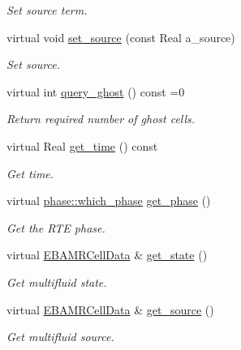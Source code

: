 \begin{DoxyCompactItemize}
\begin{DoxyCompactList}\small\item\em Set source term. \end{DoxyCompactList}\item 
virtual void \hyperlink{classrte__solver_aaf29812f6e521d9e0198eeb66485ec42}{set\+\_\+source} (const Real a\+\_\+source)
\begin{DoxyCompactList}\small\item\em Set source. \end{DoxyCompactList}\item 
virtual int \hyperlink{classrte__solver_a5f99f7de12f29d35cd5c34b4f7034a47}{query\+\_\+ghost} () const =0
\begin{DoxyCompactList}\small\item\em Return required number of ghost cells. \end{DoxyCompactList}\item 
virtual Real \hyperlink{classrte__solver_af9731409dd7c598299b17af24d10220f}{get\+\_\+time} () const 
\begin{DoxyCompactList}\small\item\em Get time. \end{DoxyCompactList}\item 
virtual \hyperlink{namespacephase_a23c76f548a5eb1955ed8c929c541108b}{phase\+::which\+\_\+phase} \hyperlink{classrte__solver_a061ff24e668e77255566fe2fbb7cd424}{get\+\_\+phase} ()
\begin{DoxyCompactList}\small\item\em Get the R\+TE phase. \end{DoxyCompactList}\item 
virtual \hyperlink{type__definitions_8H_a7e610f301989e5e07781c5e338bdb7c3}{E\+B\+A\+M\+R\+Cell\+Data} \& \hyperlink{classrte__solver_aebe53823e39bb3020620dd0018fd0e25}{get\+\_\+state} ()
\begin{DoxyCompactList}\small\item\em Get multifluid state. \end{DoxyCompactList}\item 
virtual \hyperlink{type__definitions_8H_a7e610f301989e5e07781c5e338bdb7c3}{E\+B\+A\+M\+R\+Cell\+Data} \& \hyperlink{classrte__solver_a0b8941dedf4059c614e4a94a76801b4b}{get\+\_\+source} ()
\begin{DoxyCompactList}\small\item\em Get multifluid source. \end{DoxyCompactList}\item 

\end{DoxyCompactItemize}

